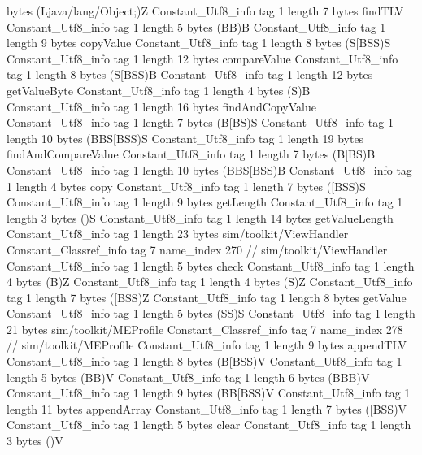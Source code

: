 {{{			bytes	(Ljava/lang/Object;)Z
		}
		Constant_Utf8_info {
			tag	1
			length	7
			bytes	findTLV
		}
		Constant_Utf8_info {
			tag	1
			length	5
			bytes	(BB)B
		}
		Constant_Utf8_info {
			tag	1
			length	9
			bytes	copyValue
		}
		Constant_Utf8_info {
			tag	1
			length	8
			bytes	(S[BSS)S
		}
		Constant_Utf8_info {
			tag	1
			length	12
			bytes	compareValue
		}
		Constant_Utf8_info {
			tag	1
			length	8
			bytes	(S[BSS)B
		}
		Constant_Utf8_info {
			tag	1
			length	12
			bytes	getValueByte
		}
		Constant_Utf8_info {
			tag	1
			length	4
			bytes	(S)B
		}
		Constant_Utf8_info {
			tag	1
			length	16
			bytes	findAndCopyValue
		}
		Constant_Utf8_info {
			tag	1
			length	7
			bytes	(B[BS)S
		}
		Constant_Utf8_info {
			tag	1
			length	10
			bytes	(BBS[BSS)S
		}
		Constant_Utf8_info {
			tag	1
			length	19
			bytes	findAndCompareValue
		}
		Constant_Utf8_info {
			tag	1
			length	7
			bytes	(B[BS)B
		}
		Constant_Utf8_info {
			tag	1
			length	10
			bytes	(BBS[BSS)B
		}
		Constant_Utf8_info {
			tag	1
			length	4
			bytes	copy
		}
		Constant_Utf8_info {
			tag	1
			length	7
			bytes	([BSS)S
		}
		Constant_Utf8_info {
			tag	1
			length	9
			bytes	getLength
		}
		Constant_Utf8_info {
			tag	1
			length	3
			bytes	()S
		}
		Constant_Utf8_info {
			tag	1
			length	14
			bytes	getValueLength
		}
		Constant_Utf8_info {
			tag	1
			length	23
			bytes	sim/toolkit/ViewHandler
		}
		Constant_Classref_info {
			tag	7
			name_index	270		// sim/toolkit/ViewHandler
		}
		Constant_Utf8_info {
			tag	1
			length	5
			bytes	check
		}
		Constant_Utf8_info {
			tag	1
			length	4
			bytes	(B)Z
		}
		Constant_Utf8_info {
			tag	1
			length	4
			bytes	(S)Z
		}
		Constant_Utf8_info {
			tag	1
			length	7
			bytes	([BSS)Z
		}
		Constant_Utf8_info {
			tag	1
			length	8
			bytes	getValue
		}
		Constant_Utf8_info {
			tag	1
			length	5
			bytes	(SS)S
		}
		Constant_Utf8_info {
			tag	1
			length	21
			bytes	sim/toolkit/MEProfile
		}
		Constant_Classref_info {
			tag	7
			name_index	278		// sim/toolkit/MEProfile
		}
		Constant_Utf8_info {
			tag	1
			length	9
			bytes	appendTLV
		}
		Constant_Utf8_info {
			tag	1
			length	8
			bytes	(B[BSS)V
		}
		Constant_Utf8_info {
			tag	1
			length	5
			bytes	(BB)V
		}
		Constant_Utf8_info {
			tag	1
			length	6
			bytes	(BBB)V
		}
		Constant_Utf8_info {
			tag	1
			length	9
			bytes	(BB[BSS)V
		}
		Constant_Utf8_info {
			tag	1
			length	11
			bytes	appendArray
		}
		Constant_Utf8_info {
			tag	1
			length	7
			bytes	([BSS)V
		}
		Constant_Utf8_info {
			tag	1
			length	5
			bytes	clear
		}
		Constant_Utf8_info {
			tag	1
			length	3
			bytes	()V
}}}

